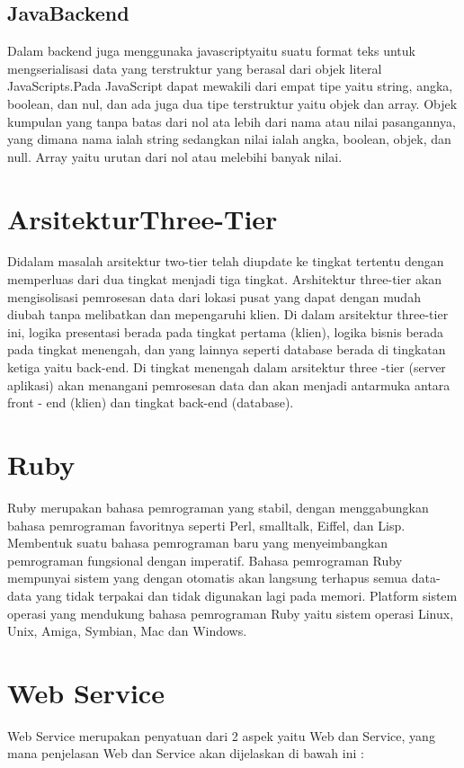 \subsection{JavaBackend}
Dalam backend juga menggunaka javascriptyaitu suatu format teks untuk mengserialisasi data yang terstruktur yang berasal dari objek literal JavaScripts.Pada JavaScript dapat mewakili dari empat tipe yaitu string, angka, boolean, dan nul, dan ada juga dua tipe terstruktur yaitu objek dan array. Objek kumpulan yang tanpa batas dari nol ata lebih dari nama atau nilai pasangannya, yang dimana nama ialah string sedangkan nilai ialah angka, boolean, objek, dan null. Array yaitu urutan dari nol atau melebihi banyak nilai.

\section{ArsitekturThree-Tier}
Didalam masalah arsitektur two-tier telah diupdate ke tingkat tertentu dengan memperluas dari dua tingkat menjadi tiga tingkat.
Arshitektur three-tier akan mengisolisasi pemrosesan data dari lokasi pusat yang dapat dengan mudah diubah tanpa melibatkan dan mepengaruhi klien. Di dalam arsitektur three-tier ini, logika presentasi berada pada tingkat pertama (klien), logika bisnis berada pada 
tingkat menengah, dan yang lainnya seperti database berada di tingkatan ketiga yaitu back-end. Di tingkat menengah dalam
arsitektur three -tier (server aplikasi) akan menangani pemrosesan data dan akan menjadi antarmuka antara front - end (klien) dan
tingkat back-end (database).

\section{Ruby}
Ruby merupakan bahasa pemrograman yang stabil, dengan menggabungkan bahasa pemrograman favoritnya seperti Perl, smalltalk, Eiffel, dan Lisp.
Membentuk suatu bahasa pemrograman baru yang menyeimbangkan pemrograman fungsional dengan imperatif.
Bahasa pemrograman Ruby mempunyai sistem yang dengan otomatis akan langsung terhapus semua data-data yang tidak terpakai dan tidak digunakan lagi pada memori. 
Platform sistem operasi yang mendukung bahasa pemrograman Ruby yaitu sistem operasi Linux, Unix, Amiga, Symbian, Mac dan Windows.

\section{Web Service}
Web Service merupakan penyatuan dari 2 aspek yaitu Web dan Service, yang mana penjelasan Web dan Service akan dijelaskan di bawah ini :

